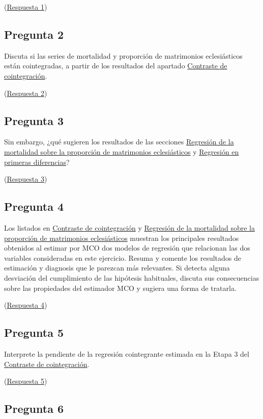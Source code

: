 \documentclass[10pt]{article}
\begin{document}
(\hyperref[sec:orgccff763]{Respuesta 1})
\subsection*{Pregunta 2}
\label{sec:orgec6b67f}

Discuta si las series de mortalidad y proporción de matrimonios
eclesiásticos están cointegradas, a partir de los resultados del
apartado \hyperref[sec:org6ae8cb0]{Contraste de cointegración}.

(\hyperref[sec:orgdcbc4ea]{Respuesta 2})
\subsection*{Pregunta 3}
\label{sec:org69e2217}

Sin embargo, ¿qué sugieren los resultados de las secciones \hyperref[sec:orgd690bd3]{Regresión de la mortalidad sobre la proporción de matrimonios eclesiásticos} y
\hyperref[sec:orgcd199e9]{Regresión en primeras diferencias}?

(\hyperref[sec:org347cdd3]{Respuesta 3})
\subsection*{Pregunta 4}
\label{sec:org80cbdbe}

Los listados en \hyperref[sec:org6ae8cb0]{Contraste de cointegración} y \hyperref[sec:orgd690bd3]{Regresión de la mortalidad sobre la proporción de matrimonios eclesiásticos} muestran
los principales resultados obtenidos al estimar por MCO dos modelos de
regresión que relacionan las dos variables consideradas en este
ejercicio. Resuma y comente los resultados de estimación y diagnosis
que le parezcan más relevantes. Si detecta alguna desviación del
cumplimiento de las hipótesis habituales, discuta sus consecuencias
sobre las propiedades del estimador MCO y sugiera una forma de
tratarla.

(\hyperref[sec:org29be2bb]{Respuesta 4})
\subsection*{Pregunta 5}
\label{sec:org3d28104}

Interprete la pendiente de la regresión cointegrante estimada en la
Etapa 3 del \hyperref[sec:org6ae8cb0]{Contraste de cointegración}.

(\hyperref[sec:org8cb8752]{Respuesta 5})
\subsection*{Pregunta 6}
\label{sec:orgc23d411}
\end{document}
